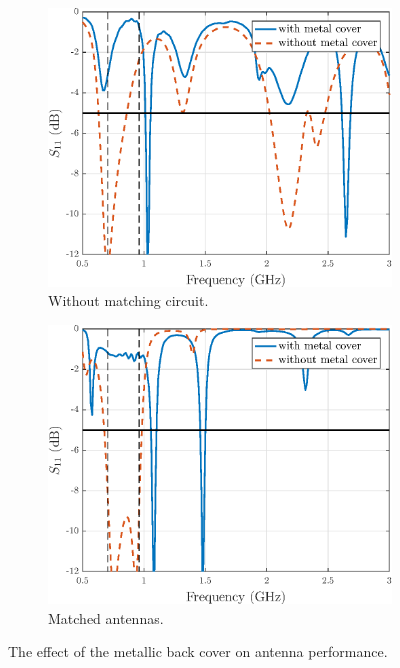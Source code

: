 \begin{figure}[H]
    \centering 
    \begin{subfigure}[b]{0.49\textwidth}
        \includegraphics[width=\textwidth]{img/metal_vs_nometal.eps}
        \caption{Without matching circuit.}
        \label{fig:metal_vs_nometal}
    \end{subfigure}
    \begin{subfigure}[b]{0.49\textwidth}
        \includegraphics[width=\textwidth]{img/metal_vs_nometal_matched.eps}
        \caption{Matched antennas.}
        \label{fig:metal_vs_nometal_matched}
    \end{subfigure}
    \caption{The effect of the metallic back cover on antenna performance.}
    \label{fig:metal_vs_nometal_results}
\end{figure}


